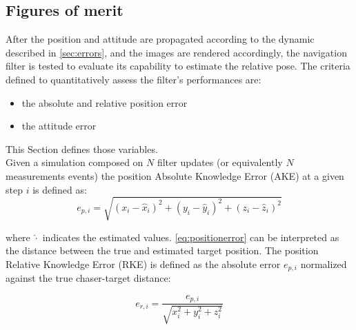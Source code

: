 \subsection{Figures of merit}
After the position and attitude are propagated according to the dynamic described in \cref{sec:errors}, and the images are rendered accordingly, the navigation filter is tested to evaluate its capability to estimate the relative pose. The criteria defined to quantitatively assess the filter's performances are:
\begin{itemize}
    \item the absolute and relative position error
    \item the attitude error
\end{itemize}
This Section defines those variables.\\
Given a simulation composed on $N$ filter updates (or equivalently $N$ measurements events) the position Absolute Knowledge Error (AKE) at a given step $i$ is defined as:
\begin{equation}
\label{eq:positionerror}
    e_{p,i} = \sqrt{(x_i -\hat{x}_i)^2 + (y_i -\hat{y}_i)^2 +(z_i -\hat{z}_i)^2 }
\end{equation}

where $\hat{\cdot}$ indicates the estimated values. \cref{eq:positionerror} can be interpreted as the distance between the true and estimated target position. The position Relative Knowledge Error (RKE) is defined as the absolute error $e_{p,i}$ normalized against the true chaser-target distance:

\begin{equation}
\label{eq:positionerrorrelative}
    e_{r,i} = \dfrac{e_{p,i}}{\sqrt{x_i^2 + y_i^2 +z_i^2 }}
\end{equation}

